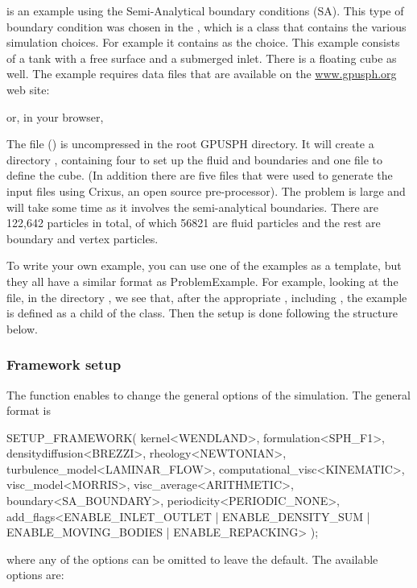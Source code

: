 \documentclass{../GPUSPHtemplate}
\begin{document}
 is an example using the Semi-Analytical boundary conditions (SA). 
This type of boundary condition was chosen in the  , 
which is a class that contains the various simulation choices. 
For example it contains  as the choice.   
This example consists of a tank with a free surface and a submerged inlet.  
There is a floating cube as well.  
The example requires data files that are available on the \url{www.gpusph.org} web site:

or, in your browser,

The file () is uncompressed 
in the root GPUSPH directory.  
It will create a directory , containing four  
to set up the fluid and boundaries and one  file to define the cube.  
(In addition there are five files that were used to generate the input files 
using Crixus, an open source pre-processor).  
The problem is large and will take some time as it involves the semi-analytical boundaries.  
There are 122,642 particles in total, of which 56821 are fluid particles 
and the rest are boundary and vertex particles.

To write your own example, you can use one of the examples as a template, 
but they all have a similar format as ProblemExample.  
For example, looking at the file,  in the directory 
, we see that, after the appropriate , 
including , the example is defined as a 
child of the  class.
Then the setup is done following the structure below.

\subsubsection{Framework setup}

The  function enables to change the
 general options of the simulation. The general format is
\begin{ccode}
  SETUP_FRAMEWORK(
    kernel<WENDLAND>,
    formulation<SPH_F1>,
    densitydiffusion<BREZZI>,
    rheology<NEWTONIAN>,
    turbulence_model<LAMINAR_FLOW>,
    computational_visc<KINEMATIC>,
    visc_model<MORRIS>,
    visc_average<ARITHMETIC>,
    boundary<SA_BOUNDARY>,
    periodicity<PERIODIC_NONE>,
    add_flags<ENABLE_INLET_OUTLET | ENABLE_DENSITY_SUM 
        | ENABLE_MOVING_BODIES | ENABLE_REPACKING>
  );
\end{ccode}
where any of the options can be omitted to leave the default. The available options are:
\end{document}
